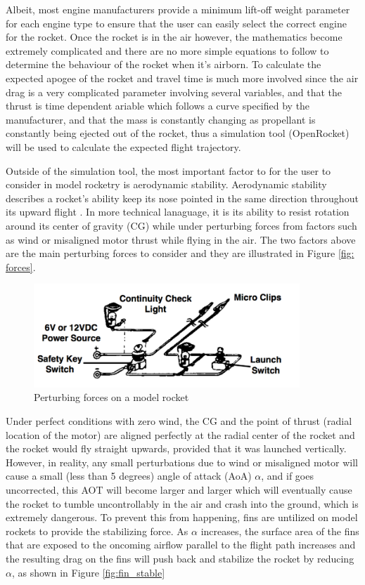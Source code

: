 \documentclass{workreport}
\begin{document}
\begin{body}
	Albeit, most engine manufacturers provide a minimum lift-off weight parameter for each engine type to ensure that the user can easily select the correct engine for the rocket. Once the rocket is in the air however, the mathematics become extremely complicated and there are no more simple equations to follow to determine the behaviour of the rocket when it's airborn. To calculate the expected apogee of the rocket and travel time is much more involved since the air drag is a very complicated parameter involving several variables, and that the thrust is time dependent ariable which follows a curve specified by the manufacturer, and that the mass is constantly changing as propellant is constantly being ejected out of the rocket, thus a simulation tool (OpenRocket) will be used to calculate the expected flight trajectory.

	Outside of the simulation tool, the most important factor to for the user to consider in model rocketry is aerodynamic stability. Aerodynamic stability describes a rocket's ability keep its nose pointed in the same direction throughout its upward flight \cite{estes_rocket_tech}. In more technical lanaguage, it is its ability to resist rotation around its center of gravity (CG) while under perturbing forces from factors such as wind or misaligned motor thrust while flying in the air. The two factors above are the main perturbing forces to consider and they are illustrated in Figure \ref{fig: forces}.

	\begin{figure}[!ht]
		\centering
		\includegraphics[width=10cm]{./images/forces.png}
		\caption{Perturbing forces on a model rocket}
		\label{fig:forces}
	\end{figure}

	Under perfect conditions with zero wind, the CG and the point of thrust (radial location of the motor) are aligned perfectly at the radial center of the rocket and the rocket would fly straight upwards, provided that it was launched vertically. However, in reality, any small perturbations due to wind or misaligned motor will cause a small (less than 5 degrees) angle of attack (AoA) $\alpha$, and if goes uncorrected, this AOT will become larger and larger which will eventually cause the rocket to tumble uncontrollably in the air and crash into the ground, which is extremely dangerous. To prevent this from happening, fins are untilized on model rockets to provide the stabilizing force. As $\alpha$ increases, the surface area of the fins that are exposed to the oncoming airflow parallel to the flight path increases and the resulting drag on the fins will push back and stabilize the rocket by reducing $\alpha$, as shown in Figure \ref{fig:fin_stable}


\end{body}
\end{document}

